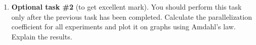 {\begin{enumerate}
		\item\textbf{Optional task \#2} (to get excellent mark). You should perform this task only after the previous task has been completed. Calculate the parallelization coefficient for all experiments and plot it on graphs using Amdahl's law. Explain the results.
	\end{enumerate}
}